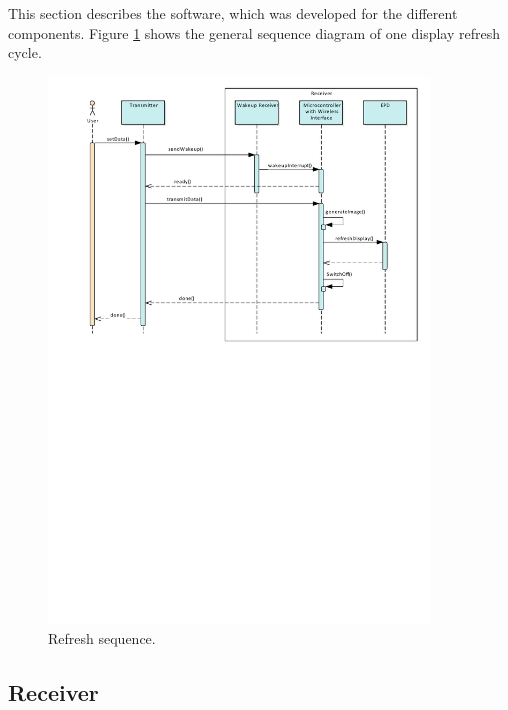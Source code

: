 This section describes the software, which was developed for the different components.
Figure \ref{software:sequence} shows the general sequence diagram of one display refresh cycle.
\begin{figure}[h]
	\centering
	\includegraphics[width=0.9\textwidth]{4-development/software/graphics/sequence.pdf}
	\caption{Refresh sequence.\label{software:sequence}}
\end{figure}

\subsection{Receiver}
\lstset{style=mystyle}

